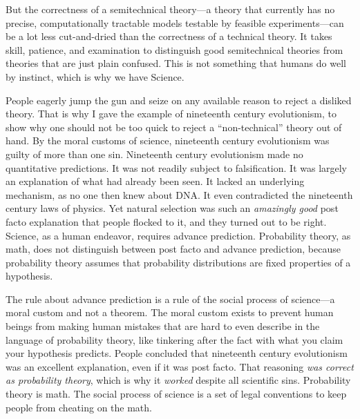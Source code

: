 {
 But the correctness of a semitechnical theory---a theory that
currently has no precise, computationally tractable models testable by
feasible experiments---can be a lot less cut-and-dried than the
correctness of a technical theory. It takes skill, patience, and
examination to distinguish good semitechnical theories from theories
that are just plain confused. This is not something that humans do well
by instinct, which is why we have Science.}

{
 People eagerly jump the gun and seize on any available reason to
reject a disliked theory. That is why I gave the example of nineteenth
century evolutionism, to show why one should not be too quick to reject
a ``non-technical'' theory out of
hand. By the moral customs of science, nineteenth century evolutionism
was guilty of more than one sin. Nineteenth century evolutionism made
no quantitative predictions. It was not readily subject to
falsification. It was largely an explanation of what had already been
seen. It lacked an underlying mechanism, as no one then knew about DNA.
It even contradicted the nineteenth century laws of physics. Yet
natural selection was such an \textit{amazingly good} post facto
explanation that people flocked to it, and they turned out to be right.
Science, as a human endeavor, requires advance prediction. Probability
theory, as math, does not distinguish between post facto and advance
prediction, because probability theory assumes that probability
distributions are fixed properties of a hypothesis.}

{
 The rule about advance prediction is a rule of the social process
of science---a moral custom and not a theorem. The moral custom exists
to prevent human beings from making human mistakes that are hard to
even describe in the language of probability theory, like tinkering
after the fact with what you claim your hypothesis predicts. People
concluded that nineteenth century evolutionism was an excellent
explanation, even if it was post facto. That reasoning \textit{was
correct as probability theory}, which is why it \textit{worked} despite
all scientific sins. Probability theory is math. The social process of
science is a set of legal conventions to keep people from cheating on
the math.}

